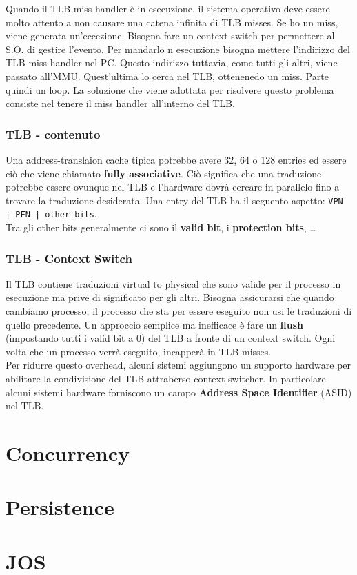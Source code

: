 \documentclass[12pt, letterpaper]{article}
\begin{document}
				Quando il TLB miss-handler è in esecuzione, il sistema operativo deve essere molto attento a non causare una catena infinita di TLB misses. Se ho un miss, viene generata un'eccezione. Bisogna fare un context switch per permettere al S.O. di gestire l'evento. Per mandarlo n esecuzione bisogna mettere l'indirizzo del TLB miss-handler nel PC. Questo indirizzo tuttavia, come tutti gli altri, viene passato all'MMU. Quest'ultima lo cerca nel TLB, ottenenedo un miss. Parte quindi un loop. La soluzione che viene adottata per risolvere questo problema consiste nel tenere il miss handler all'interno del TLB.
				
				
			\subsubsection{TLB - contenuto}
				Una address-translaion cache tipica potrebbe avere 32, 64 o 128 entries ed essere ciò che viene chiamato \textbf{fully associative}. Ciò significa che una traduzione potrebbe essere ovunque nel TLB e l'hardware dovrà cercare in parallelo fino a trovare la traduzione desiderata. Una entry del TLB ha il seguento aspetto: \texttt{VPN | PFN | other bits}.\\
				Tra gli other bits generalmente ci sono il \textbf{valid bit}, i \textbf{protection bits}, \dots
				
			\subsubsection{TLB - Context Switch}
				Il TLB contiene traduzioni virtual to physical che sono valide per il processo in esecuzione ma prive di significato per gli altri. Bisogna assicurarsi che quando cambiamo processo, il processo che sta per essere eseguito non usi le traduzioni di quello precedente. Un approccio semplice ma inefficace è fare un \textbf{flush} (impostando tutti i valid bit a 0) del TLB a fronte di un context switch. Ogni volta che un processo verrà eseguito, incapperà in TLB misses.\\
				Per ridurre questo overhead, alcuni sistemi aggiungono un supporto hardware per abilitare la condivisione del TLB attraberso context switcher. In particolare alcuni sistemi hardware forniscono un campo \textbf{Address Space Identifier} (ASID) nel TLB. 
				
				
				
	\newpage	
	\section{Concurrency}
	
	\section{Persistence}
	
	\section{JOS}
\end{document}
